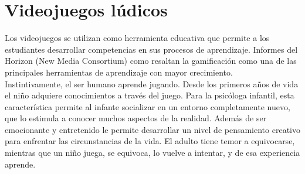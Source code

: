\section{Videojuegos lúdicos}

Los videojuegos se utilizan como herramienta educativa que permite a los estudiantes desarrollar competencias en sus procesos de aprendizaje. Informes del Horizon (New Media Consortium) como \cite[Games and gamification]{vid07} resaltan la gamificación como una de las principales herramientas de aprendizaje con mayor crecimiento.
\\[1pt]

Instintivamente, el ser humano aprende jugando. Desde los primeros años de vida el niño adquiere conocimientos a través del juego. Para la psicóloga infantil, esta característica permite al infante socializar en un entorno completamente nuevo, que lo estimula a conocer muchos aspectos de la realidad. Además de ser emocionante y entretenido le permite desarrollar un nivel de pensamiento creativo para enfrentar las circunstancias de la vida. El adulto tiene temor a equivocarse, mientras que un niño juega, se equivoca, lo vuelve a intentar, y de esa experiencia aprende.
\\[1pt]


